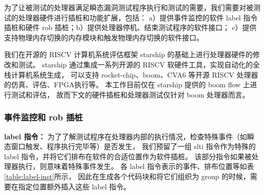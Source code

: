 为了让被测试的处理器满足瞬态漏洞测试程序执行和测试的需要，我们需要对被测试的处理器硬件进行插桩和功能扩展，包括：
a）提供事件监控的软件 label 指令插桩和硬件 rob 插桩；b）提供处理器停机、结束测试程序的软件接口；
c）提供支持物理内存切换的内存模块和触发物理内存切换的软件接口。\par

我们在开源的 RISCV 计算机系统评估框架 starship\cite{starship} 的基础上进行处理器硬件的修改和测试。
starship 通过集成一系列开源的 RISCV 软硬件工具，实现自动化的全栈计算机系统生成，
可以支持 rocket-chip\cite{rocket-chip}、boom\cite{celio2017boomv2}、CVA6\cite{cva6} 等开源 RISCV 处理器的仿真、评估、FPGA执行等。
本工作目前仅在 starship 提供的 boom flow 上进行测试和评估，
故而下文的硬件插桩和处理器测试仅针对 boom 处理器而言。\par

\subsubsection{事件监控和 rob 插桩}
\textbf{label 指令：}
为了了解测试程序在处理器内部的执行情况，检查特殊事件（如瞬态窗口触发、程序执行完毕等）是否发生，
我们预留了一组 slti 指令作为特殊的 label 指令，并将它们排布在软件的合适位置作为软件插桩。
该部分指令如果被处理器执行，则意味着特殊事件发生。
各 label 指令表示的事件、排布位置等如表\ref{table:label-inst}所示，
因此在生成各个代码块和将它们组织为 group 的时候，需要在指定位置额外插入这些 label 指令。\par

